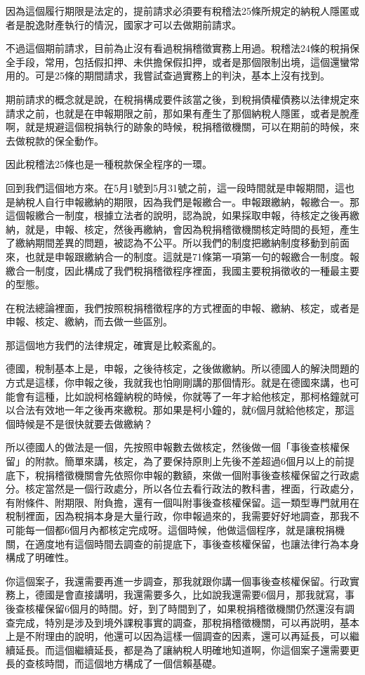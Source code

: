 \documentclass[oneside,sub3section]{ctexbook}
\begin{document}
因為這個履行期限是法定的，提前請求必須要有稅稽法25條所規定的納稅人隱匿或者是脫逸財產執行的情況，國家才可以去做期前請求。

不過這個期前請求，目前為止沒有看過稅捐稽徵實務上用過。稅稽法24條的稅捐保全手段，常用，包括假扣押、未供擔保假扣押，或者是那個限制出境，這個還蠻常用的。可是25條的期間請求，我嘗試查過實務上的判決，基本上沒有找到。

期前請求的概念就是說，在稅捐構成要件該當之後，到稅捐債權債務以法律規定來請求之前，也就是在申報期限之前，那如果有產生了那個納稅人隱匿，或者是脫產啊，就是規避這個稅捐執行的跡象的時候，稅捐稽徵機關，可以在期前的時候，來去做稅款的保全動作。

因此稅稽法25條也是一種稅款保全程序的一環。

回到我們這個地方來。在5月1號到5月31號之前，這一段時間就是申報期間，這也是納稅人自行申報繳納的期限，因為我們是報繳合一。申報跟繳納，報繳合一。那這個報繳合一制度，根據立法者的說明，認為說，如果採取申報，待核定之後再繳納，就是，申報、核定，然後再繳納，會因為稅捐稽徵機關核定時間的長短，產生了繳納期間差異的問題，被認為不公平。所以我們的制度把繳納制度移動到前面來，也就是申報跟繳納合一的制度。這就是71條第一項第一句的報繳合一制度。報繳合一制度，因此構成了我們稅捐稽徵程序裡面，我國主要稅捐徵收的一種最主要的型態。

在稅法總論裡面，我們按照稅捐稽徵程序的方式裡面的申報、繳納、核定，或者是申報、核定、繳納，而去做一些區別。

那這個地方我們的法律規定，確實是比較紊亂的。

德國，稅制基本上是，申報，之後待核定，之後做繳納。所以德國人的解決問題的方式是這樣，你申報之後，我就我也怕剛剛講的那個情形。就是在德國來講，也可能會有這種，比如說柯格鐘納稅的時候，你就等了一年才給他核定，那柯格鐘就可以合法有效地一年之後再來繳稅。那如果是柯小鐘的，就6個月就給他核定，那這個時候是不是很快就要去做繳納？

所以德國人的做法是一個，先按照申報數去做核定，然後做一個「事後查核權保留」的附款。簡單來講，核定，為了要保持原則上先後不差超過6個月以上的前提底下，稅捐稽徵機關會先依照你申報的數額，來做一個附事後查核權保留之行政處分。核定當然是一個行政處分，所以各位去看行政法的教科書，裡面，行政處分，有附條件、附期限、附負擔，還有一個叫附事後查核權保留。這一類型專門就用在稅制裡面，因為稅捐本身是大量行政，你申報過來的，我需要好好地調查，那我不可能每一個都6個月內都核定完成呀。這個時候，他做這個程序，就是讓稅捐機關，在適度地有這個時間去調查的前提底下，事後查核權保留，也讓法律行為本身構成了明確性。

你這個案子，我還需要再進一步調查，那我就跟你講一個事後查核權保留。行政實務上，德國是會直接講明，我還需要多久，比如說我還需要6個月，那我就寫，事後查核權保留6個月的時間。好，到了時間到了，如果稅捐稽徵機關仍然還沒有調查完成，特別是涉及到境外課稅事實的調查，那稅捐稽徵機關，可以再説明，基本上是不附理由的說明，他還可以因為這樣一個調查的因素，還可以再延長，可以繼續延長。而這個繼續延長，都是為了讓納稅人明確地知道啊，你這個案子還需要更長的查核時間，而這個地方構成了一個信賴基礎。
\end{document}
